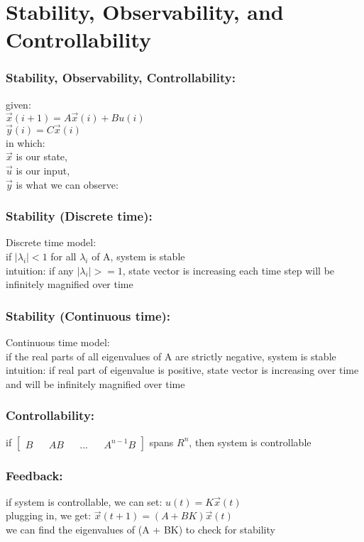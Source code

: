 \section{Stability, Observability, and Controllability}

\begin{frame}
\frametitle{Stability, Observability, Controllability:}

given: \\ 
$\vec{x}(i+1) = A\vec{x}(i) + Bu(i)$ \\
$\vec{y}(i) = C\vec{x}(i)$ \\
in which: \\
$\vec{x}$ is our state, \\
$\vec{u}$ is our input, \\
$\vec{y}$ is what we can observe: \\
\end{frame}

\begin{frame}
\frametitle{Stability (Discrete time):}

Discrete time model: \\
if $|\lambda_{i}| < 1$ for all $\lambda_{i}$ of A, system is stable\\
intuition: if any $|\lambda_{i}| >= 1$, state vector is increasing each time step will be infinitely magnified over time \\
\end{frame}

\begin{frame}
\frametitle{Stability (Continuous time):}

Continuous time model: \\
if the real parts of all eigenvalues of A are strictly negative, system is stable\\
intuition: if real part of eigenvalue is positive, state vector is increasing over time and will be infinitely magnified over time \\
\end{frame}

\begin{frame}
\frametitle{Controllability:}

if
$\begin{bmatrix}
B && AB && ... && A^{n-1}B
\end{bmatrix}$
spans $R^{n}$, then system is controllable 
\end{frame}

\begin{frame}
\frametitle{Feedback:}

if system is controllable, we can set: 
$u(t) = K\vec{x}(t)$ \\
plugging in, we get: 
$\vec{x}(t+1) = (A + BK)\vec{x}(t)$ \\
we can find the eigenvalues of (A + BK) to check for stability
\end{frame}

